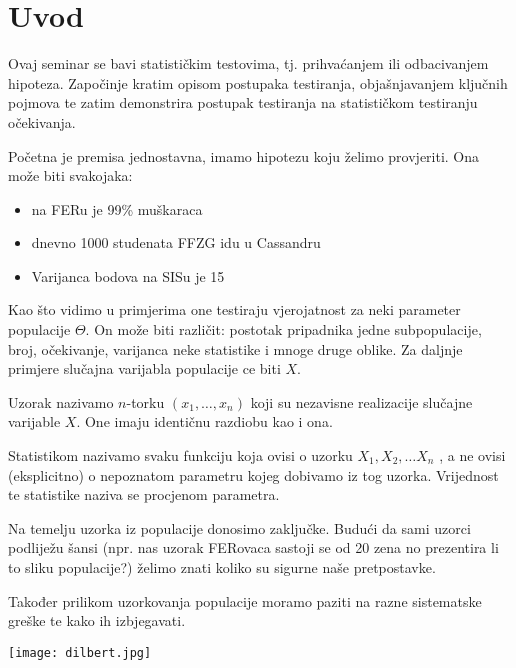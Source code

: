 \chapter{Uvod}
\label{Chapter1}

Ovaj seminar se bavi statističkim testovima, tj. prihvaćanjem ili odbacivanjem hipoteza. Započinje kratim opisom postupaka testiranja, objašnjavanjem ključnih pojmova te zatim demonstrira postupak testiranja na statističkom testiranju očekivanja.

Početna je premisa jednostavna, imamo hipotezu koju želimo provjeriti. Ona može biti svakojaka:

\begin{itemize}
\item na FERu je 99\% muškaraca 
\item dnevno 1000 studenata FFZG idu u Cassandru
\item Varijanca bodova na SISu je 15
\end{itemize}

Kao što vidimo u primjerima one testiraju vjerojatnost za neki parameter populacije $\Theta$. On može biti različit: postotak pripadnika jedne subpopulacije, broj, očekivanje, varijanca neke statistike i mnoge druge oblike. Za daljnje primjere slučajna varijabla populacije ce biti $X$.

Uzorak nazivamo $n$-torku $(x_1, \ldots, x_n)$ koji su nezavisne realizacije slučajne varijable $X$. One imaju identičnu razdiobu kao i ona.\cite{vis3}

Statistikom nazivamo svaku funkciju koja ovisi o uzorku $X_1 , X_2 , \ldots X_n$ , a ne ovisi (eksplicitno) o nepoznatom parametru kojeg dobivamo iz tog uzorka. \cite{vis3} Vrijednost te statistike naziva se procjenom parametra. \cite{vis3}

Na temelju uzorka iz populacije donosimo zaključke. Budući da sami uzorci podliježu šansi (npr. nas uzorak FERovaca sastoji se od 20 zena no prezentira li to sliku populacije?) želimo znati koliko su sigurne naše pretpostavke. 

Također prilikom uzorkovanja populacije moramo paziti na razne sistematske greške te kako ih izbjegavati. 

\texttt{[image: dilbert.jpg]}
